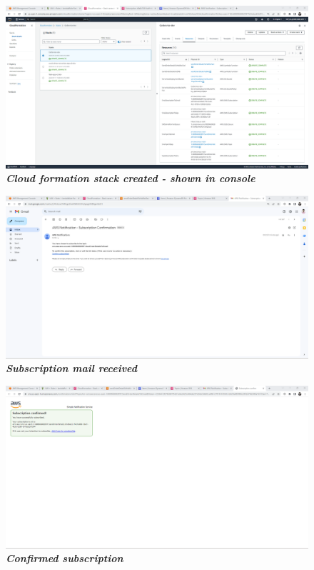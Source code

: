     \begin{figure}[htp]
        \centering
        \includegraphics[scale=1, width=15cm]{PROBLEM 3/Screenshots/2.2 tech stacck created - shown in console.png}
        \caption{\textbf{\textit{Cloud formation stack created - shown in console}}}
        \label{fig:}
    \end{figure}

    \begin{figure}[htp]
        \centering
        \includegraphics[scale=1, width=15cm]{PROBLEM 3/Screenshots/2.3 subsctription mail received.png}
        \caption{\textbf{\textit{Subscription mail received}}}
        \label{fig:}
    \end{figure}

    \begin{figure}[htp]
        \centering
        \includegraphics[scale=1, width=15cm]{PROBLEM 3/Screenshots/2.4 confirmed subscription.png}
        \caption{\textbf{\textit{Confirmed subscription}}}
        \label{fig:}
    \end{figure}

